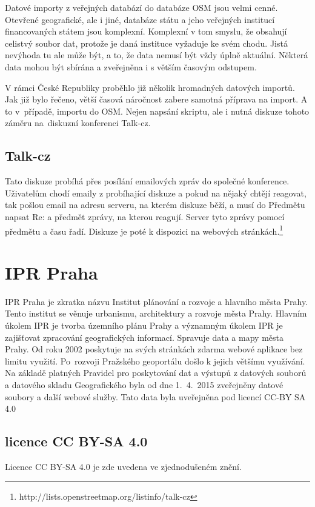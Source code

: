 Datové importy z veřejných databází do databáze OSM jsou velmi cenné. 
Otevřené geografické, ale i jiné, databáze státu a jeho veřejných institucí 
financovaných státem jsou komplexní. Komplexní v tom smyslu, že obsahují celistvý
soubor dat, protože je daná instituce vyžaduje ke svém chodu. Jistá nevýhoda tu 
ale může být, a to, že data nemusí být vždy úplně aktuální. Některá data mohou 
být sbírána a zveřejněna i s větším časovým odstupem.

V rámci České Republiky proběhlo již několik hromadných datových importů. Jak 
již bylo řečeno, větší časová náročnost zabere samotná příprava na import. A to
v~případě, importu do OSM. Nejen napsání skriptu, ale i nutná diskuze tohoto záměru
na~diskuzní konferenci Talk-cz. 

\subsection{Talk-cz}
\label{Talk-cz}
Tato diskuze probíhá přes posílání emailových zpráv do společné konference. 
Uživatelům chodí emaily z probíhající diskuze a pokud na nějaký chtějí reagovat,
tak pošlou email na adresu serveru, na kterém diskuze běží, a musí do Předmětu 
napsat Re: a předmět zprávy, na kterou reagují. Server tyto zprávy pomocí 
předmětu a času řadí. Diskuze je poté k dispozici na webových stránkách.\footnote{http://lists.openstreetmap.org/listinfo/talk-cz}

\section{IPR Praha}
\label{IPR Praha}
IPR Praha je zkratka názvu Institut plánování a rozvoje a hlavního města Prahy. 
Tento institut se věnuje urbanismu, architektury a rozvoje města Prahy. Hlavním
úkolem IPR je tvorba územního plánu Prahy a významným úkolem IPR je zajišťovat
zpracování geografických informací. Spravuje data a mapy města Prahy. Od roku 
2002 poskytuje na svých stránkách zdarma webové aplikace bez limitu využití. 
Po~rozvoji Pražského geoportálu došlo k jejich většímu využívání.  Na základě 
platných Pravidel pro poskytování dat a  výstupů z datových souborů a datového 
skladu Geografického byla od dne 1.~4.~2015 zveřejněny datové soubory a další 
webové služby. Tato data byla uveřejněna pod licencí CC-BY SA 4.0 \cite{IPR}
\subsection{licence CC BY-SA 4.0}
\label{licence CC BY-SA 4.0}
Licence CC BY-SA 4.0 je zde uvedena ve zjednodušeném znění.


